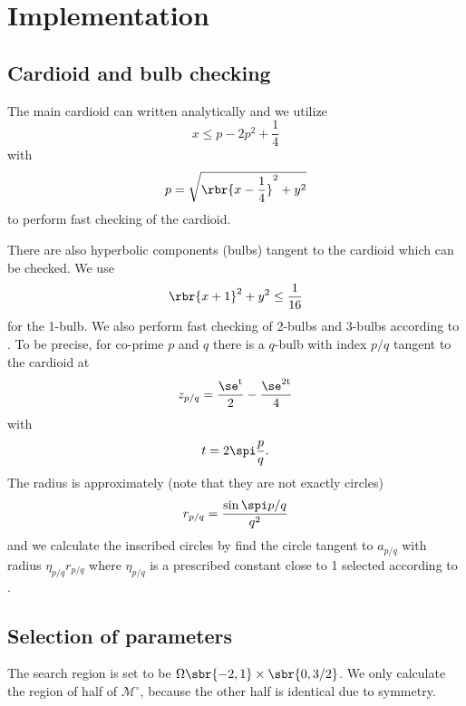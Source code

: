 \documentclass[english, nochinese]{pnote}
\begin{document}
\section{Implementation}

\subsection{Cardioid and bulb checking}

The main cardioid can written analytically and we utilize
\begin{equation}
x \le p - 2 p^2 + \frac{1}{4}
\end{equation}
with
\begin{equation}
p = \sqrt{ \rbr{ x - \frac{1}{4} }^2 + y^2 }
\end{equation}
to perform fast checking of the cardioid.

There are also hyperbolic components (bulbs) tangent to the cardioid which can be checked. We use
\begin{equation}
\rbr{ x + 1 }^2 + y^2 \le \frac{1}{16}
\end{equation}
for the 1-bulb. We also perform fast checking of 2-bulbs and 3-bulbs according to \parencite{linas_vepstas_mandelbrot_nodate}. To be precise, for co-prime $p$ and $q$ there is a $q$-bulb with index $ p / q $ tangent to the cardioid at
\begin{equation}
z_{ p / q } = \frac{\se^{ \si t }}{2} - \frac{\se^{ 2 \si t }}{4}
\end{equation}
with
\begin{equation}
t = 2 \spi \frac{p}{q}.
\end{equation}
The radius is approximately (note that they are not exactly circles)
\begin{equation}
r_{ p / q } = \frac{ \sin \spi p / q }{q^2}
\end{equation}
and we calculate the inscribed circles by find the circle tangent to $ a_{ p / q } $ with radius $ \eta_{ p / q } r_{ p / q } $ where $ \eta_{ p / q } $ is a prescribed constant close to 1 selected according to \parencite{linas_vepstas_mandelbrot_nodate}.

\subsection{Selection of parameters}

The search region is set to be $ \Omega \sbr{ -2, 1 } \times \sbr{ 0, 3 / 2 } $. We only calculate the region of half of $\mathcal{M}^{\circ}$, because the other half is identical due to symmetry.
\end{document}
